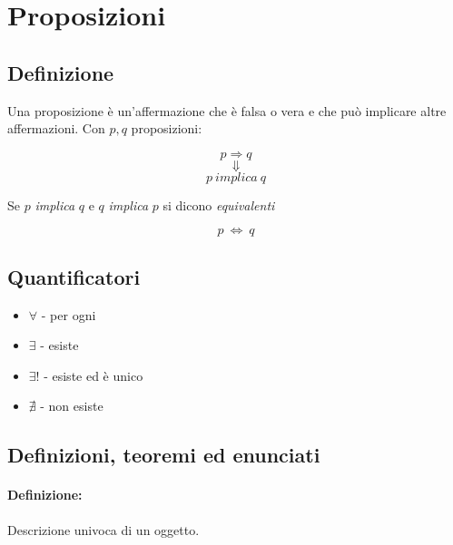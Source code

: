 \documentclass{article}
\begin{document}
\section{Proposizioni}
    \subsection{Definizione}
        Una proposizione è un'affermazione che è falsa o vera e che può implicare altre affermazioni.
        \newpage
        Con $p, q$ proposizioni:

        \begin{LARGE}
            \begin{equation*}
                p \Rightarrow q
            \end{equation*}
        \begin{equation*}
              \Downarrow
        \end{equation*}
        \begin{equation*}
              p\ implica\ q
        \end{equation*}
        \end{LARGE}
        Se $p$ \textit{implica} $q$ e $q$ \textit{implica} $p$ si dicono \textit{equivalenti}\newline
        \begin{LARGE}
            \begin{equation*}
                p\ \iff\ q
            \end{equation*}
        \end{LARGE}
        \subsection{Quantificatori}
            \begin{itemize}
                \item $\forall$ - per ogni
                \item $\exists$ - esiste
                \item $\exists!$ - esiste ed è unico
                \item $\nexists$ - non esiste
            \end{itemize}
        \subsection{Definizioni, teoremi ed enunciati}
        \paragraph{Definizione:\\ }
            Descrizione univoca di un oggetto.
\end{document}
